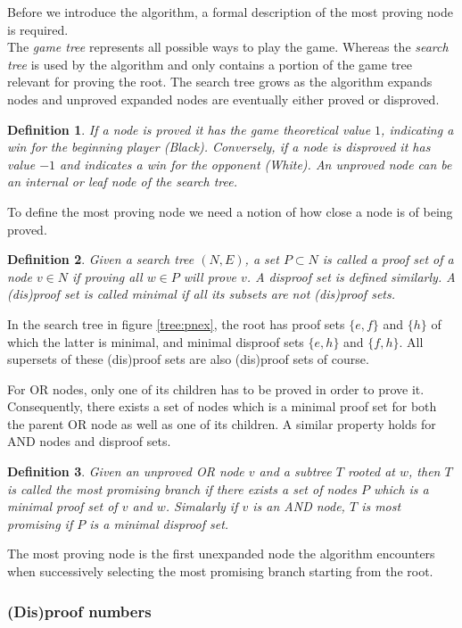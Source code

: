 \documentclass{article}
\newtheorem{mydef}{Definition}
\begin{document}
Before we introduce the algorithm, a formal description of the most proving node is required.\\
The \textit{game tree} represents all possible ways to play the game. Whereas the \textit{search tree} is used by the algorithm
and only contains a portion of the game tree relevant for proving the root. The search tree grows as the algorithm expands nodes and
unproved expanded nodes are eventually either proved or disproved.
\begin{mydef}
If a node is proved it has the game theoretical value $1$, indicating a win for the beginning player (Black).
Conversely, if a node is disproved it has value $-1$ and indicates a win for the opponent (White).
An unproved node can be an internal or leaf node of the search tree.
\end{mydef}

To define the most proving node we need a notion of how close a node is of being proved.
\begin{mydef}
Given a search tree $(N, E)$, a set $P \subset N$ is called a proof set of a node $v \in N$ if proving all $w \in P$ will prove $v$.
A disproof set is defined similarly. A (dis)proof set is called minimal if all its subsets are not (dis)proof sets.
\end{mydef}
In the search tree in figure \ref{tree:pnex}, the root has proof sets $\{e, f\}$ and $\{h\}$ of which the latter is minimal,
and minimal disproof sets $\{e, h\}$ and $\{f, h\}$. All supersets of these (dis)proof sets are also (dis)proof sets of course.

For OR nodes, only one of its children has to be proved in order to prove it. Consequently, there exists a set of nodes which is a minimal
proof set for both the parent OR node as well as one of its children. A similar property holds for AND nodes and disproof sets.
\begin{mydef}
Given an unproved OR node $v$ and a subtree $T$ rooted at $w$, then $T$ is called the most promising branch if there exists a set of nodes $P$
which is a minimal proof set of $v$ and $w$. Simalarly if $v$ is an AND node, $T$ is most promising if $P$ is a minimal disproof set.
\end{mydef}
The most proving node is the first unexpanded node the algorithm encounters when successively selecting the most promising branch starting from
the root.

\subsubsection*{(Dis)proof numbers}
\end{document}
